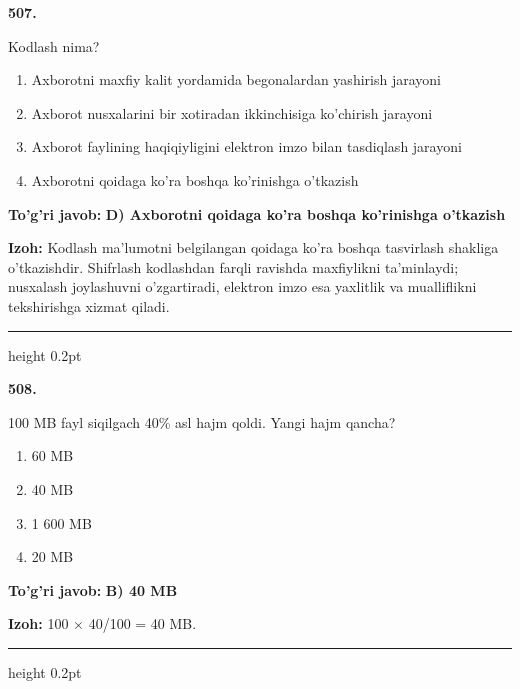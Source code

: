 \documentclass[10pt,a4paper,oneside]{article}
\begin{document}
\noindent\textbf{\color{ink}507.}
\par
Kodlash nima?
\begin{enumerate}[label=\Alph*),leftmargin=9mm]
\item Axborotni maxfiy kalit yordamida begonalardan yashirish jarayoni
\item Axborot nusxalarini bir xotiradan ikkinchisiga ko'chirish jarayoni
\item Axborot faylining haqiqiyligini elektron imzo bilan tasdiqlash jarayoni
\item Axborotni qoidaga ko'ra boshqa ko'rinishga o'tkazish
\end{enumerate}
\begin{tcolorbox}[enhanced,breakable,colback=teal!4,colframe=teal!50!black,boxrule=0.5pt,arc=1.1mm,left=3mm,right=3mm,top=1.7mm,bottom=1.7mm,before skip=2mm,after skip=2mm]
\textbf{\color{teal}To'g'ri javob:} \textbf{D) Axborotni qoidaga ko'ra boshqa ko'rinishga o'tkazish}
\par\smallskip
\textbf{Izoh:} Kodlash ma'lumotni belgilangan qoidaga ko'ra boshqa tasvirlash shakliga o'tkazishdir. Shifrlash kodlashdan farqli ravishda maxfiylikni ta'minlaydi; nusxalash joylashuvni o'zgartiradi, elektron imzo esa yaxlitlik va mualliflikni tekshirishga xizmat qiladi.
\end{tcolorbox}
\vspace{2mm}\hrule height 0.2pt \vspace{3mm}

\noindent\textbf{\color{ink}508.}
\par
100 MB fayl siqilgach 40\% asl hajm qoldi. Yangi hajm qancha?
\begin{enumerate}[label=\Alph*),leftmargin=9mm]
\item 60 MB
\item 40 MB
\item 1 600 MB
\item 20 MB
\end{enumerate}
\begin{tcolorbox}[enhanced,breakable,colback=teal!4,colframe=teal!50!black,boxrule=0.5pt,arc=1.1mm,left=3mm,right=3mm,top=1.7mm,bottom=1.7mm,before skip=2mm,after skip=2mm]
\textbf{\color{teal}To'g'ri javob:} \textbf{B) 40 MB}
\par\smallskip
\textbf{Izoh:} 100 \ensuremath{\times} 40/100 = 40 MB.
\end{tcolorbox}
\vspace{2mm}\hrule height 0.2pt \vspace{3mm}
\end{document}
